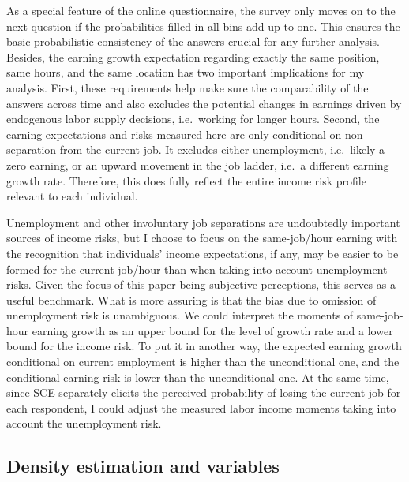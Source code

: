 \documentclass[12pt,notitlepage,onecolumn,aps,pra]{article}
\begin{document}
As a special feature of the online questionnaire, the survey only moves
on to the next question if the probabilities filled in all bins add up
to one. This ensures the basic probabilistic consistency of the answers
crucial for any further analysis. Besides, the earning growth
expectation regarding exactly the same position, same hours, and the
same location has two important implications for my analysis. First,
these requirements help make sure the comparability of the answers
across time and also excludes the potential changes in earnings driven
by endogenous labor supply decisions, i.e.~working for longer hours.
Second, the earning expectations and risks measured here are only
conditional on non-separation from the current job. It excludes either
unemployment, i.e.~likely a zero earning, or an upward movement in the
job ladder, i.e.~a different earning growth rate. Therefore, this does
fully reflect the entire income risk profile relevant to each
individual.

Unemployment and other involuntary job separations are undoubtedly
important sources of income risks, but I choose to focus on the
same-job/hour earning with the recognition that individuals' income
expectations, if any, may be easier to be formed for the current
job/hour than when taking into account unemployment risks. Given the
focus of this paper being subjective perceptions, this serves as a
useful benchmark. What is more assuring is that the bias due to omission
of unemployment risk is unambiguous. We could interpret the moments of
same-job-hour earning growth as an upper bound for the level of growth
rate and a lower bound for the income risk. To put it in another way,
the expected earning growth conditional on current employment is higher
than the unconditional one, and the conditional earning risk is lower
than the unconditional one. At the same time, since SCE separately
elicits the perceived probability of losing the current job for each
respondent, I could adjust the measured labor income moments taking into
account the unemployment risk.

\hypertarget{density-estimation-and-variables}{%
\subsection{Density estimation and
variables}\label{density-estimation-and-variables}}
\end{document}
